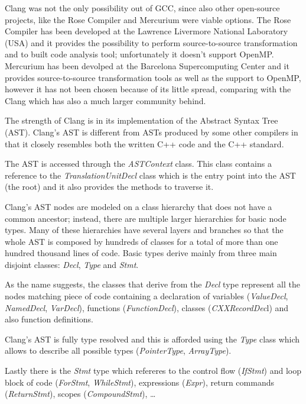 \documentclass[a4paper,11pt,oneside]{book}
\begin{document}
Clang was not the only possibility out of GCC, since also other open-source projects, like the Rose Compiler \cite{rose} and Mercurium \cite{mercurium} were viable options. The Rose Compiler has been developed at the Lawrence Livermore National Laboratory (USA) and it provides the possibility to perform source-to-source transformation and to built code analysis tool; unfortunately it doesn't support OpenMP. Mercurium has been devolped at the Barcelona Supercomputing Center and it provides source-to-source transformation tools as well as the support to OpenMP, however it has not been chosen because of its little spread, comparing with the Clang which has also a much larger community behind. 

The strength of Clang is in its implementation of the Abstract Syntax Tree (AST). Clang’s AST is different from ASTs produced by some other compilers in that it closely resembles both the written C++ code and the C++ standard.

The AST is accessed through the \emph{ASTContext} class. This class contains a reference to the \emph{TranslationUnitDecl} class which is the entry point into the AST (the root) and it also provides the methods to traverse it.

Clang’s AST nodes are modeled on a class hierarchy that does not have a common ancestor; instead, there are multiple larger hierarchies for basic node types. Many of these hierarchies have several layers and branches so that the whole AST is composed by hundreds of classes for a total of more than one hundred thousand lines of code. Basic types derive mainly from three main disjoint classes: \emph{Decl}, \emph{Type} and \emph{Stmt}. 

As the name suggests, the classes that derive from the \emph{Decl} type represent all the nodes matching piece of code containing a declaration of variables (\emph{ValueDecl}, \emph{NamedDecl}, \emph{VarDecl}), functions (\emph{FunctionDecl}), classes (\emph{CXXRecordDec}l) and also function definitions.

Clang’s AST is fully type resolved and this is afforded using the \emph{Type} class which allows to describe all possible types (\emph{PointerType}, \emph{ArrayType}).

Lastly there is the \emph{Stmt} type which refereres to the control flow (\emph{IfStmt}) and loop block of code (\emph{ForStmt}, \emph{WhileStmt}), expressions (\emph{Expr}), return commands (\emph{ReturnStmt}), scopes (\emph{CompoundStmt}), \dots 
\end{document}

